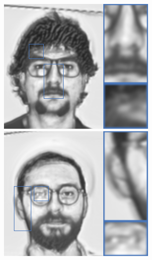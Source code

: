 \documentclass[10pt,twocolumn,letterpaper]{article}
\begin{document}
\begin{figure}[htbp]
{\begin{minipage}[b]{0.13\linewidth}
\includegraphics[width=0.99\linewidth]{img/sketch_result/bfcn_s3.png}
\includegraphics[width=0.99\linewidth]{img/sketch_result/bfcn_s4.png}
\end{minipage}
}
\end{figure}
\end{document}
